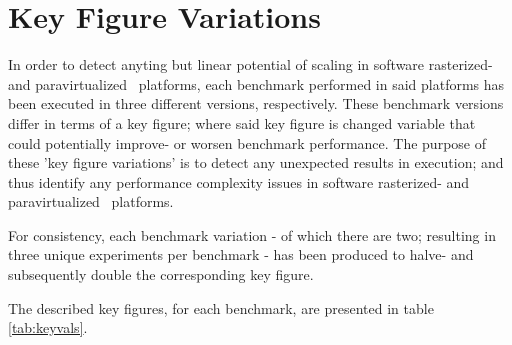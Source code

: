 \section{Key Figure Variations}
\label{sec:methodologyexperiment_keyfigurevariations}
In order to detect anyting but linear potential of scaling in software rasterized- and paravirtualized \dvttermsimics\ platforms, each benchmark performed in said platforms has been executed in three different versions, respectively.
These benchmark versions differ in terms of a key figure; where said key figure is changed variable that could potentially improve- or worsen benchmark performance.
The purpose of these 'key figure variations' is to detect any unexpected results in execution; and thus identify any performance complexity issues in software rasterized- and paravirtualized \dvttermsimics\ platforms.

For consistency, each benchmark variation - of which there are two; resulting in three unique experiments per benchmark - has been produced to halve- and subsequently double the corresponding key figure.

\noindent
The described key figures, for each benchmark, are presented in table \ref{tab:keyvals}.


